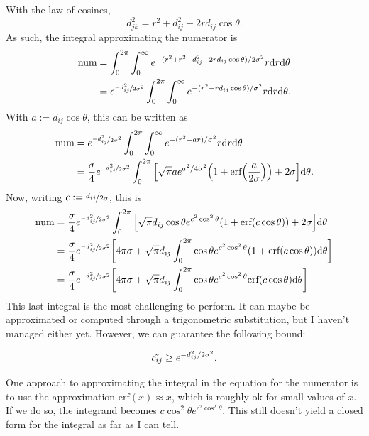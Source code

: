 \documentclass{article}
\begin{document}
\begin{multicols}{2}
With the law of cosines, 
\begin{equation*}
    d_{jk}^2 = r^2+d_{ij}^2-2rd_{ij}\cos\theta.
\end{equation*}
As such, the integral approximating the numerator is
\begin{align*}
    \text{num} &= \int_{0}^{2\pi}\int_0^{\infty}e^{-(r^2+r^2+d_{ij}^2-2rd_{ij}\cos\theta)/2\sigma^2}r\dd r\dd \theta\\
    &= e^{\nicefrac{-d_{ij}^2}{2\sigma^2}}\int_{0}^{2\pi}\int_0^{\infty}e^{-(r^2-rd_{ij}\cos\theta)/\sigma^2}r\dd r\dd \theta.
\end{align*}
With $a:=d_{ij}\cos\theta$, this can be written as
\begin{align*}
    \text{num} &= e^{\nicefrac{-d_{ij}^2}{2\sigma^2}}\int_{0}^{2\pi}\int_0^{\infty}e^{-(r^2-ar)/\sigma^2}r\dd r\dd \theta\\
    &= \frac{\sigma}{4} e^{\nicefrac{-d_{ij}^2}{2\sigma^2}}\int_{0}^{2\pi}\qty[\sqrt{\pi}ae^{a^2/4\sigma^2}\qty(1+\text{erf}\qty(\frac{a}{2\sigma})) + 2\sigma]\dd \theta.
\end{align*}
Now, writing $c:=\nicefrac{d_{ij}}{2\sigma}$, this is
\begin{align*}
    \text{num} &= \frac{\sigma}{4} e^{\nicefrac{-d_{ij}^2}{2\sigma^2}}\int_{0}^{2\pi}\qty[\sqrt{\pi}d_{ij}\cos\theta e^{c^2\cos^2\theta}\qty(1+\text{erf}\qty(c\cos\theta)) + 2\sigma]\dd \theta\\
    &= \frac{\sigma}{4} e^{\nicefrac{-d_{ij}^2}{2\sigma^2}}\qty[4\pi\sigma + \sqrt{\pi}d_{ij}\int_{0}^{2\pi}\cos\theta e^{c^2\cos^2\theta}\qty(1+\text{erf}\qty(c\cos\theta))\dd \theta]\\
    &= \frac{\sigma}{4} e^{\nicefrac{-d_{ij}^2}{2\sigma^2}}\qty[4\pi\sigma + \sqrt{\pi}d_{ij}\int_{0}^{2\pi}\cos\theta e^{c^2\cos^2\theta}\text{erf}\qty(c\cos\theta)\dd \theta]
\end{align*}
This last integral is the most challenging to perform. It can maybe be approximated or computed through a trigonometric substitution, but I haven't managed either yet. However, we can guarantee the following bound:

\begin{equation}
    \Tilde{c_{ij}} \geq e^{-d_{ij}^2/2\sigma^2}.
\end{equation}

One approach to approximating the integral in the equation for the numerator is to use the approximation $\text{erf}(x) \approx x$, which is roughly ok for small values of $x$. If we do so, the integrand becomes $c\cos^2\theta e^{c^2\cos^2\theta}$. This still doesn't yield a closed form for the integral as far as I can tell. 


\end{multicols}
\end{document}
